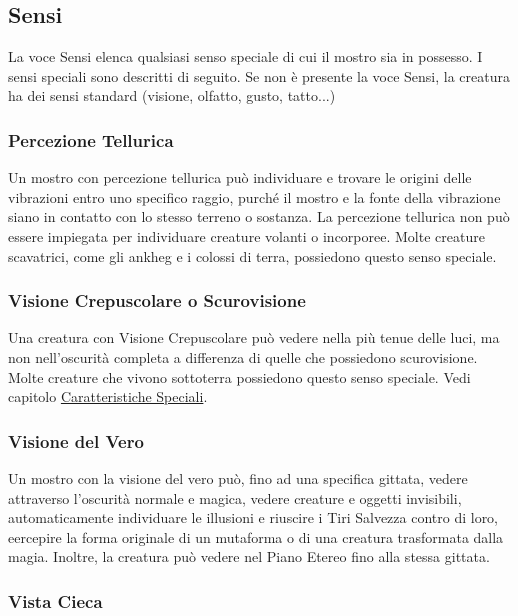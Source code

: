 \begin{multicols}{2}
\subsection{Sensi}

La voce Sensi elenca qualsiasi senso speciale di cui il mostro sia in possesso. I sensi speciali sono descritti di seguito. Se non è presente la voce Sensi, la creatura ha dei sensi standard (visione, olfatto, gusto, tatto...)

\subsubsection{Percezione Tellurica}

Un mostro con percezione tellurica può individuare e trovare le origini delle vibrazioni entro uno specifico raggio, purché il mostro e la fonte della vibrazione siano in contatto con lo stesso terreno o sostanza. La percezione tellurica non può essere impiegata per individuare creature volanti o incorporee. Molte creature scavatrici, come gli ankheg e i colossi di terra, possiedono questo senso speciale.

\subsubsection{Visione Crepuscolare o Scurovisione}

Una creatura con Visione Crepuscolare può vedere nella più tenue delle luci, ma non nell'oscurità completa a differenza di quelle che possiedono scurovisione. Molte creature che vivono sottoterra possiedono questo senso speciale.  Vedi capitolo \hyperlink{visioneeluce}{Caratteristiche Speciali}.

\subsubsection{Visione del Vero}

Un mostro con la visione del vero può, fino ad una specifica gittata, vedere attraverso l'oscurità normale e magica, vedere creature e oggetti invisibili, automaticamente individuare le illusioni e riuscire i Tiri Salvezza contro di loro, eercepire la forma originale di un mutaforma o di una creatura trasformata dalla magia. Inoltre, la creatura può vedere nel Piano Etereo fino alla stessa gittata.

\subsubsection{Vista Cieca}


\end{multicols}

